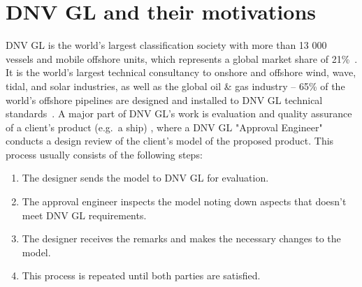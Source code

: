 % 


\section{DNV GL and their motivations}
DNV GL is the world's largest classification society with more than 13 000 vessels and mobile offshore units, which represents a global market share of 21\%~\citep{TO:DNVGL}. 
It is the world's largest technical consultancy to onshore and offshore wind, wave, tidal, and solar industries, as well as the global oil \& gas industry 
-- 65\% of the world’s offshore pipelines are designed and installed to DNV GL technical standards~\citep{MTN:DNVGL}. 
A major part of DNV GL's work is evaluation and quality assurance of a client's product (e.g.~a ship) , 
where a DNV GL "Approval Engineer" conducts a design review of the client's model of the proposed product. 
This process usually consists of the following steps: 

\begin{enumerate}
	\item The designer sends the model to DNV GL for evaluation.
	\item The approval engineer inspects the model noting down aspects that doesn't meet DNV GL requirements.
	\item The designer receives the remarks and makes the necessary changes to the model.
	\item This process is repeated until both parties are satisfied.
\end{enumerate}

